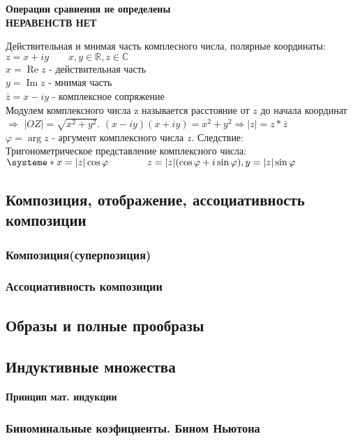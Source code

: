 \documentclass[14pt,a4paper]{scrartcl}
\theoremstyle{definition}
\theoremstyle{remark}
\theoremstyle{definition}
\theoremstyle{definition}
\begin{document}
\begin{center}
{\textbf{Операции сравнения не определены \\ НЕРАВЕНСТВ НЕТ}}
\end{center}
Действительная и мнимая часть комплесного числа, полярные координаты:
$z = x + iy \qquad x,y \in \mathbb{R}, z \in \mathbb{C}$\\
$x = \operatorname{Re}z$ - действительная часть\\
$y = \operatorname{Im}z$ - мнимая часть\\
$\bar{z} = x - iy$ - комплексное сопряжение\\
Модулем комплексного числа z называется расстояние от $z$ до начала координат $\Rightarrow$
$\vert OZ \vert = \sqrt{x^2 + y^2}$. \quad
$(x-iy)(x+iy) = x^2 + y^2 \Rightarrow  |z|= z*\bar{z}$ \\
$\varphi = \operatorname{arg} z$ - аргумент комплексного числа $z$. Следствие:\\
Тригонометрическое представление комплексного числа:\\
$\systeme*{x = |z|\cos{\varphi}\qquad\qquad z = |z|(\cos{\varphi} + i\sin{\varphi}) , y = |z|\sin{\varphi}}$
\pagebreak
\subsection{Композиция, отображение, ассоциативность композиции}
\subsubsection{Композиция(суперпозиция)}
\subsubsection{Ассоциативность композиции}
\subsection{Образы и полные прообразы}
\subsection{Индуктивные множества}
\paragraph{Принцип мат. индукции}
\subsubsection{Биноминальные коэфициенты. Бином Ньютона}
\end{document}
